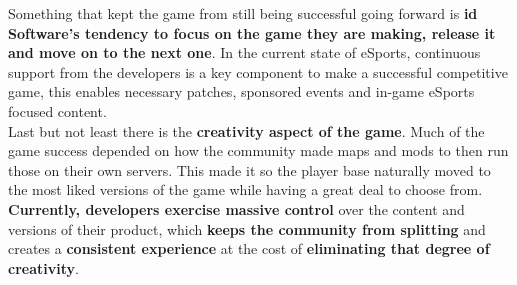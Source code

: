 Something that kept the game from still being successful going forward is \textbf{id Software's tendency to focus on the game they are making, release it and move on to the next one}. In the current state of eSports, continuous support from the developers is a key component to make a successful competitive game, this enables necessary patches, sponsored events and in-game eSports focused content.\\

Last but not least there is the \textbf{creativity aspect of the game}. Much of the game success depended on how the community made maps and mods to then run those on their own servers. This made it so the player base naturally moved to the most liked versions of the game while having a great deal to choose from. \textbf{Currently, developers exercise massive control} over the content and versions of their product, which\textbf{ keeps the community from splitting} and creates a \textbf{consistent experience} at the cost of \textbf{eliminating that degree of creativity}.
